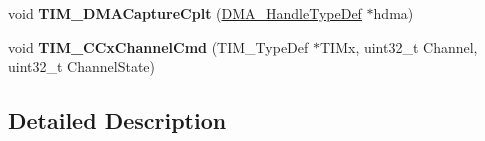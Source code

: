 \begin{DoxyCompactItemize}
\item 
\mbox{\label{group___t_i_m___private___functions_ga60b9c315720fddb3db32299f05f7d712}} 
void {\bfseries T\+I\+M\+\_\+\+D\+M\+A\+Capture\+Cplt} (\hyperlink{group___d_m_a___exported___types_ga92b907d56a9c29b93d46782a7a04f91e}{D\+M\+A\+\_\+\+Handle\+Type\+Def} $\ast$hdma)
\item 
\mbox{\label{group___t_i_m___private___functions_ga7fcc6d5ca311c37f5d0250687c899924}} 
void {\bfseries T\+I\+M\+\_\+\+C\+Cx\+Channel\+Cmd} (T\+I\+M\+\_\+\+Type\+Def $\ast$T\+I\+Mx, uint32\+\_\+t Channel, uint32\+\_\+t Channel\+State)
\end{DoxyCompactItemize}


\subsection{Detailed Description}
